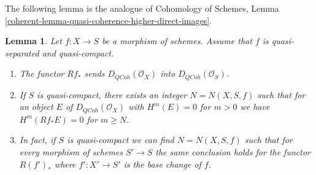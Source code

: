 \documentclass{stacks-project}
\theoremstyle{plain}
\newtheorem{lemma}[subsection]{Lemma}
\theoremstyle{definition}
\theoremstyle{remark}
\numberwithin{equation}{subsection}
\def\QCoh{\mathit{QCoh}}
\begin{document}
\noindent
The following lemma is the analogue of
Cohomology of Schemes, Lemma
\ref{coherent-lemma-quasi-coherence-higher-direct-images}.

\begin{lemma}
\label{lemma-quasi-coherence-direct-image}
Let $f : X \to S$ be a morphism of schemes.
Assume that $f$ is quasi-separated and quasi-compact.
\begin{enumerate}
\item The functor $Rf_*$ sends $D_\QCoh(\mathcal{O}_X)$
into $D_\QCoh(\mathcal{O}_S)$.
\item If $S$ is quasi-compact, there exists an integer $N = N(X, S, f)$
such that for an object $E$ of $D_\QCoh(\mathcal{O}_X)$
with $H^m(E) = 0$ for $m > 0$ we have
$H^m(Rf_*E) = 0$ for $m \geq N$.
\item In fact, if $S$ is quasi-compact we can find $N = N(X, S, f)$
such that for every morphism of schemes $S' \to S$
the same conclusion holds for the functor $R(f')_*$
where $f' : X' \to S'$ is the base change of $f$.
\end{enumerate}
\end{lemma}
\end{document}
